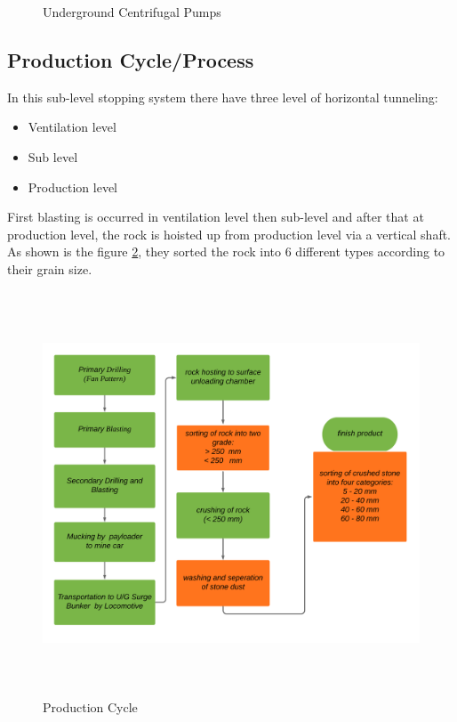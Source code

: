 \documentclass[12pt,a4paper]{article}
\begin{document}
\begin{figure}[ht]
\centering
{}
\caption{Underground Centrifugal Pumps}
\label{pump}
\end{figure}


\subsection{Production Cycle/Process}
In this sub-level stopping system there have three level of horizontal tunneling:
\begin{itemize}
\item Ventilation level
\item Sub level
\item Production level
\end{itemize}
First blasting is occurred in ventilation level then sub-level and after that at production level, the rock is hoisted up from production level via a vertical shaft. As shown is the figure \ref{flowchart}, they sorted the rock into 6 different types according to their grain size.
\begin{figure}[ht]
\centering
\includegraphics[width=\linewidth, height= 12cm]{flowchart.png}
\caption{Production Cycle}
\label{flowchart}
\end{figure}
\clearpage
\end{document}
